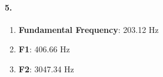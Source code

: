 \documentclass[12pt]{article}
\begin{document}
\paragraph{5.}
\begin{enumerate}[label=\textbf{\alph*.}]
    \item \textbf{Fundamental Frequency}: 203.12 Hz
    \item \textbf{F1}: 406.66 Hz
    \item \textbf{F2}: 3047.34 Hz
\end{enumerate}
\end{document}
